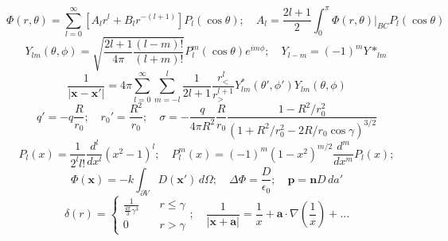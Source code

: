 \documentclass[9pt,letterpaper]{article}
\newcommand{\vect}[1]{\mathbf{#1}}
\newcommand{\epo}{\epsilon_0}
\begin{document}
$$\Phi(r,\theta) = \sum_{l=0}^\infty{[A_lr^l+B_lr^{-(l+1)}]P_l(\cos\theta)};\quad A_l=\frac{2l+1}{2}\int_0^\pi\Phi(r,\theta)|_{BC}P_l(\cos\theta)$$
$$Y_{lm}(\theta,\phi)=\sqrt{\frac{2l+1}{4\pi}\frac{(l-m)!}{(l+m)!}}P_l^m(\cos\theta)e^{im\phi};\quad Y_{l-m} = (-1)^mY*_{lm}$$
$$\frac{1}{|\vect x-\vect x'|}=4\pi\sum_{l=0}^\infty\sum_{m=-l}^l\frac{1}{2l+1}\frac{r^l_<}{r^{l+1}_>}Y^*_{lm}(\theta',\phi')Y_{lm}(\theta,\phi)$$
$$q'=-q\frac{R}{r_0};\quad r_0' = \frac{R^2}{r_0};\quad\sigma=-\frac{q}{4\pi R^2}\frac{R}{r_0}\frac{1-R^2/r_0^2}{(1+R^2/r_0^2-2R/r_0\cos\gamma)^{3/2}}$$
$$P_l(x)=\frac{1}{2^ll!}\frac{d^l}{dx^l}(x^2-1)^l;\quad P_l^m(x)=(-1)^m(1-x^2)^{m/2}\frac{d^m}{dx^m}P_l(x);$$
$$\Phi(\vect x) = -k\int_{\partial V}D(\vect x')\,d\Omega;\quad \Delta\Phi = \frac{D}{\epo};\quad\vect p=\vect nD\,da'$$
$$\delta(r)=\begin{cases}\frac{1}{\frac{4\pi}{3}\gamma^3}&\quad r\le \gamma\\0&\quad r>\gamma\end{cases};\quad\frac{1}{|\vect x+\vect a|}=\frac{1}{x}+\vect a\cdot\nabla\left(\frac 1x\right)+...$$
\end{document}
